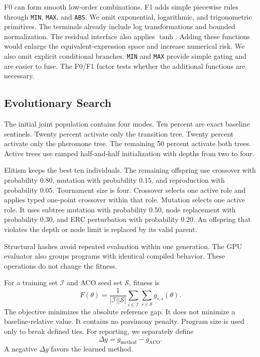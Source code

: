 \documentclass[letterpaper,journal]{IEEEtran}
\begin{document}
F0 can form smooth low-order combinations.
F1 adds simple piecewise rules through \texttt{MIN}, \texttt{MAX}, and
\texttt{ABS}.
We omit exponential, logarithmic, and trigonometric primitives.
The terminals already include log transformations and bounded normalization.
The residual interface also applies \(\tanh\).
Adding these functions would enlarge the equivalent-expression space and
increase numerical risk.
We also omit explicit conditional branches.
\texttt{MIN} and \texttt{MAX} provide simple gating and are easier to fuse.
The F0/F1 factor tests whether the additional functions are necessary.

\subsection{Evolutionary Search}

The initial joint population contains four modes.
Ten percent are exact baseline sentinels.
Twenty percent activate only the transition tree.
Twenty percent activate only the pheromone tree.
The remaining 50 percent activate both trees.
Active trees use ramped half-and-half initialization with depths from two to four.

Elitism keeps the best ten individuals.
The remaining offspring use crossover with probability \(0.80\), mutation with probability \(0.15\), and reproduction with probability \(0.05\).
Tournament size is four.
Crossover selects one active role and applies typed one-point crossover within that role.
Mutation selects one active role.
It uses subtree mutation with probability \(0.50\), node replacement with probability \(0.30\), and ERC perturbation with probability \(0.20\).
An offspring that violates the depth or node limit is replaced by its valid parent.

Structural hashes avoid repeated evaluation within one generation.
The GPU evaluator also groups programs with identical compiled behavior.
These operations do not change the fitness.

For a training set \(\mathcal{I}\) and ACO seed set \(\mathcal{S}\), fitness is
\begin{equation}
    F(\theta)
    =
    \frac{1}{|\mathcal{I}||\mathcal{S}|}
    \sum_{i\in\mathcal{I}}
    \sum_{s\in\mathcal{S}}
    g_{i,s}(\theta).
    \label{eq:fitness}
\end{equation}
The objective minimizes the absolute reference gap.
It does not minimize a baseline-relative value.
It contains no parsimony penalty.
Program size is used only to break defined ties.
For reporting, we separately define
\begin{equation}
    \Delta g=g_{\mathrm{method}}-g_{\mathrm{ACO}}.
    \label{eq:delta}
\end{equation}
A negative \(\Delta g\) favors the learned method.
\end{document}
